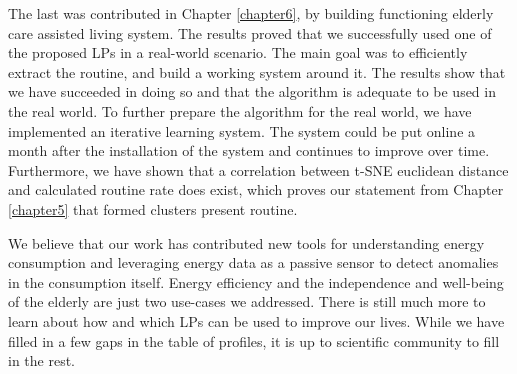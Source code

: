 The last was contributed in Chapter \ref{chapter6}, by building functioning elderly care assisted living system. 
The results proved that we successfully used one of the proposed LPs in a real-world scenario. 
The main goal was to efficiently extract the routine, and build a working system around it.
The results show that we have succeeded in doing so and that the algorithm is adequate to be used in the real world.
To further prepare the algorithm for the real world, we have implemented an iterative learning system.
The system could be put online a month after the installation of the system and continues to improve over time.
Furthermore, we have shown that a correlation between t-SNE euclidean distance and calculated routine rate does exist,
which proves our statement from Chapter \ref{chapter5} that formed clusters present routine.

We believe that our work has contributed new tools for understanding energy consumption and leveraging energy data as a passive sensor to detect anomalies in the consumption itself.
Energy efficiency and the independence and well-being of the elderly are just two use-cases we addressed.
There is still much more to learn about how and which LPs can be used to improve our lives.
While we have filled in a few gaps in the table of profiles, it is up to scientific community to fill in the rest.



